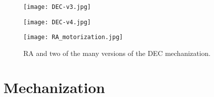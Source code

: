 
\begin{figure*}
    \begin{minipage}[c][10cm][c]{0.5\textwidth}
        \centering
        \vspace*{\fill}
        \texttt{[image: DEC-v3.jpg]}
        \label{fig:DEC_mechanism_v3}
        
        \addtocounter{subfigure}{1}
        \texttt{[image: DEC-v4.jpg]}
        \addtocounter{subfigure}{-2}
        \label{fig:DEC_mechanism_v1p} 
    \end{minipage}
    \begin{minipage}[c][10cm][t]{0.5\textwidth}
        \vspace*{\fill}
        \centering
        \texttt{[image: RA\_motorization.jpg]}
        \label{fig:RA_mechanization}
    \end{minipage}
    \caption{RA and two of the many versions of the DEC mechanization.}
    \label{fig:dec-versions}
\end{figure*}

\section{Mechanization}
\label{sec:mechanization}



